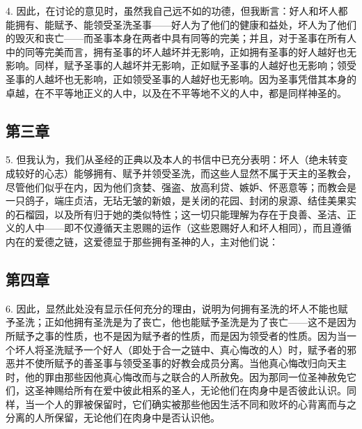 4. 因此，在讨论的意见时，虽然我自己远不如的功德，但我断言：好人和坏人都能拥有、能赋予、能领受圣洗圣事——好人为了他们的健康和益处，坏人为了他们的毁灭和丧亡——而圣事本身在两者中具有同等的完美；并且，对于圣事在所有人中的同等完美而言，拥有圣事的坏人越坏并无影响，正如拥有圣事的好人越好也无影响。同样，赋予圣事的人越坏并无影响，正如赋予圣事的人越好也无影响；领受圣事的人越坏也无影响，正如领受圣事的人越好也无影响。因为圣事凭借其本身的卓越，在不平等地正义的人中，以及在不平等地不义的人中，都是同样神圣的。\par


\subsection{第三章}

5. 但我认为，我们从圣经的正典以及本人的书信中已充分表明：坏人（绝未转变成较好的心志）能够拥有、赋予并领受圣洗，而这些人显然不属于天主的圣教会，尽管他们似乎在内，因为他们贪婪、强盗、放高利贷、嫉妒、怀恶意等；而教会是一只鸽子，端庄贞洁，无玷无皱的新娘，是关闭的花园、封闭的泉源、结佳美果实的石榴园，以及所有归于她的类似特性；这一切只能理解为存在于良善、圣洁、正义的人中——即不仅遵循天主恩赐的运作（这些恩赐好人和坏人相同），而且遵循内在的爱德之链，这爱德显于那些拥有圣神的人，主对他们说：\par


\subsection{第四章}

6. 因此，显然此处没有显示任何充分的理由，说明为何拥有圣洗的坏人不能也赋予圣洗；正如他拥有圣洗是为了丧亡，他也能赋予圣洗是为了丧亡——这不是因为所赋予之事的性质，也不是因为赋予者的性质，而是因为领受者的性质。因为当一个坏人将圣洗赋予一个好人（即处于合一之链中、真心悔改的人）时，赋予者的邪恶并不使所赋予的善圣事与领受圣事的好教会成员分离。当他真心悔改归向天主时，他的罪由那些因他真心悔改而与之联合的人所赦免。因为那同一位圣神赦免它们，这圣神赐给所有在爱中彼此相系的圣人，无论他们在肉身中是否彼此认识。同样，当一个人的罪被保留时，它们确实被那些他因生活不同和败坏的心背离而与之分离的人所保留，无论他们在肉身中是否认识他。\par

